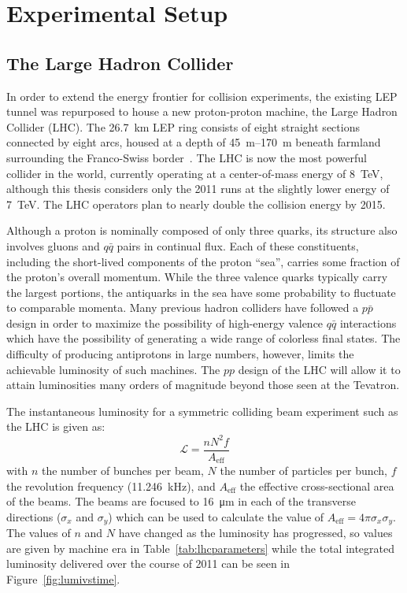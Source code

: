 \chapter{Experimental Setup}
\label{chapter:experiment}

\section{The Large Hadron Collider}
In order to extend the energy frontier for collision experiments, the existing LEP tunnel was repurposed to house a new proton-proton machine, the Large Hadron Collider (LHC).  The \SI{26.7}{km} LEP ring consists of eight straight sections connected by eight arcs, housed at a depth of \SIrange{45}{170}{m} beneath farmland surrounding the Franco-Swiss border~\cite{Evans:1129806}.  The LHC is now the most powerful collider in the world, currently operating at a center-of-mass energy of \SI{8}{\TeV}, although this thesis considers only the 2011 runs at the slightly lower energy of \SI{7}{\TeV}.  The LHC operators plan to nearly double the collision energy by 2015.

Although a proton is nominally composed of only three quarks, its structure also involves gluons and $q\bar{q}$ pairs in continual flux.  Each of these constituents, including the short-lived components of the proton ``sea'', carries some fraction of the proton's overall momentum.  While the three valence quarks typically carry the largest portions, the antiquarks in the sea have some probability to fluctuate to comparable momenta.  Many previous hadron colliders have followed a $p\bar{p}$ design in order to maximize the possibility of high-energy valence $q\bar{q}$ interactions which have the possibility of generating a wide range of colorless final states.  The difficulty of producing antiprotons in large numbers, however, limits the achievable luminosity of such machines.  The $pp$ design of the LHC will allow it to attain luminosities many orders of magnitude beyond those seen at the Tevatron.  

The instantaneous luminosity for a symmetric colliding beam experiment such as the LHC is given as:
\begin{equation}
  \label{eq:luminosity}
  \mathcal{L} = \frac{n N^2 f}{A_\text{eff}}
\end{equation}
with $n$ the number of bunches per beam, $N$ the number of particles per bunch, $f$ the revolution frequency (\SI{11.246}{kHz}), and $A_\text{eff}$ the effective cross-sectional area of the beams.  The beams are focused to \SI{16}{\micro m} in each of the transverse directions ($\sigma_x$ and $\sigma_y$) which can be used to calculate the value of $A_\text{eff} = 4\pi \sigma_x \sigma_y$. The values of $n$ and $N$ have changed as the luminosity has progressed, so values are given by machine era in Table~\ref{tab:lhcparameters} while the total integrated luminosity delivered over the course of 2011 can be seen in Figure~\ref{fig:lumivstime}.

